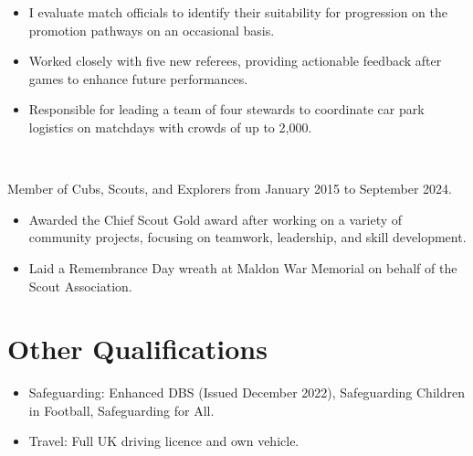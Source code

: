 \begin{itemize}
    \item I evaluate match officials to identify their suitability for progression on the promotion pathways on an occasional basis.
    \item Worked closely with five new referees, providing actionable feedback after games to enhance future performances.
\end{itemize}

\begin{itemize}
    \item Responsible for leading a team of four stewards to coordinate car park logistics on matchdays with crowds of up to 2,000.
\end{itemize}

\\\begin{small}Member of Cubs, Scouts, and Explorers from January 2015 to September 2024.\end{small}
\begin{itemize}
    \item Awarded the Chief Scout Gold award after working on a variety of community projects, focusing on teamwork, leadership, and skill development.
    \item Laid a Remembrance Day wreath at Maldon War Memorial on behalf of the Scout Association.
\end{itemize}

\section*{Other Qualifications}

\begin{itemize}
    \item Safeguarding: Enhanced DBS (Issued December 2022), Safeguarding Children in Football, Safeguarding for All.
    \item Travel: Full UK driving licence and own vehicle.
\end{itemize}
